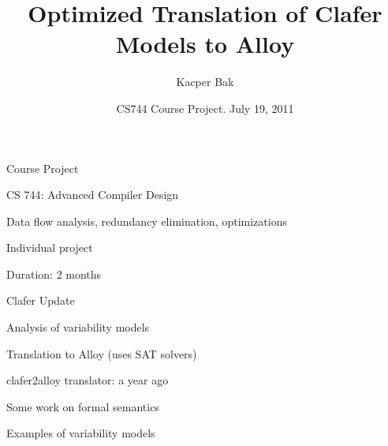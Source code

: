 \documentclass[table,15pt,t]{beamer}
\title{Optimized Translation of Clafer Models to Alloy}
\author{Kacper Bak}
\institute{\small Generative Software Development Lab\\University of Waterloo}
\date{CS744 Course Project. July 19, 2011}
\newcommand{\vmiddle}[1]{
  \vspace{\stretch{1}}
  #1
  \vspace{\stretch{1}}
}
\newcommand{\mlist}[1]{
\vmiddle{
  \begin{list}{}{}
    #1
  \end{list}
  }
}
\newcounter{i}
\begin{document}
\begin{frame}[plain]
  \vmiddle{\titlepage}
\end{frame}

\begin{frame}{Course Project}
  \mlist{
  \item CS 744: Advanced Compiler Design
  \item Data flow analysis, redundancy elimination, optimizations
  \item Individual project
  \item Duration: 2 months
  }
\end{frame}

\begin{frame}{Clafer Update}
  \mlist{
    \item Analysis of variability models
    \item Translation to Alloy (uses SAT solvers)
    \item \textsf{clafer2alloy} translator: a year ago
    \item Some work on formal semantics
    \item Examples of variability models
  }
\end{frame}
\end{document}
